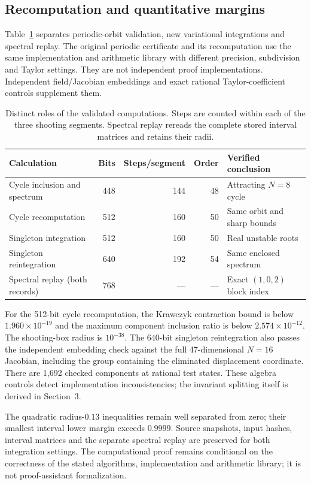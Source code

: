 \documentclass[11pt]{article}
\begin{document}
\subsection{Recomputation and quantitative margins}
Table~\ref{tab:validation} separates periodic-orbit validation, new
variational integrations and spectral replay. The original periodic
certificate and its recomputation use the same implementation and arithmetic
library with different precision, subdivision and Taylor settings. They
are not independent proof implementations. Independent field/Jacobian
embeddings and exact rational Taylor-coefficient controls supplement them.

\begin{table}[t]
\centering\small
\begin{tabular}{lrrrl}
\toprule
Calculation & Bits & Steps/segment & Order & Verified conclusion\\
\midrule
Cycle inclusion and spectrum &448&144&48&Attracting $N=8$ cycle\\
Cycle recomputation &512&160&50&Same orbit and sharp bounds\\
Singleton integration &512&160&50&Real unstable roots\\
Singleton reintegration &640&192&54&Same enclosed spectrum\\
Spectral replay (both records)&768&---&---&Exact $(1,0,2)$ block index\\
\bottomrule
\end{tabular}
\caption{Distinct roles of the validated computations. Steps are counted
within each of the three shooting segments. Spectral replay rereads the
complete stored interval matrices and retains their radii.}
\label{tab:validation}
\end{table}

For the 512-bit cycle recomputation, the Krawczyk contraction bound is
below $1.960\times10^{-19}$ and the maximum component inclusion ratio is
below $2.574\times10^{-12}$. The shooting-box radius is $10^{-38}$.
The 640-bit singleton reintegration also passes the independent embedding
check against the full 47-dimensional $N=16$ Jacobian, including the group
containing the eliminated displacement coordinate. There are 1,692 checked
components at rational test states. These algebra controls detect
implementation inconsistencies; the invariant splitting itself is derived
in Section~3.

The quadratic radius-$0.13$ inequalities remain well separated from zero;
their smallest interval lower margin exceeds $0.9999$. Source snapshots,
input hashes, interval matrices and the separate spectral replay are
preserved for both integration settings. The computational proof remains
conditional on the correctness of the stated algorithms, implementation
and arithmetic library; it is not proof-assistant formalization.
\end{document}
